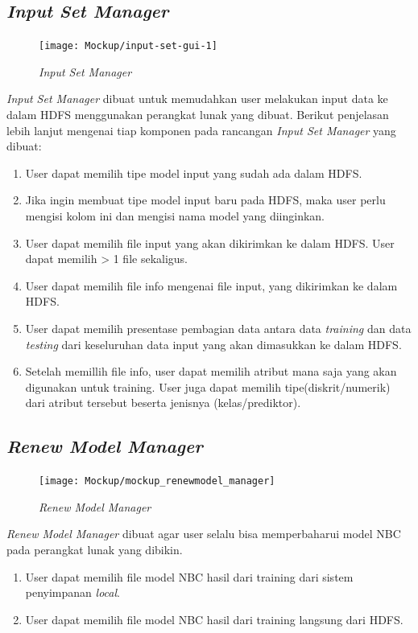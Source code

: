 \subsection{\textit{Input Set Manager}}
\label{subsec:Input Set Manager}

\begin{figure}[H]
	\centering
	\texttt{[image: Mockup/input-set-gui-1]}
	\caption[\textit{Input Set Manager}]{\textit{Input Set Manager}}
	\label{fig:Input Set Manager}
\end{figure}
\textit{Input Set Manager} dibuat untuk memudahkan user melakukan input data ke dalam HDFS menggunakan perangkat lunak yang dibuat. Berikut penjelasan lebih lanjut mengenai tiap komponen pada rancangan \textit{Input Set Manager} yang dibuat:
\begin{enumerate}
	\item User dapat memilih tipe model input yang sudah ada dalam HDFS.
	\item Jika ingin membuat tipe model input baru pada HDFS, maka user perlu mengisi kolom ini dan mengisi nama model yang diinginkan.
	\item User dapat memilih file input yang akan dikirimkan ke dalam HDFS. User dapat memilih > 1 file sekaligus.
	\item User dapat memilih file info mengenai file input, yang dikirimkan ke dalam HDFS.
	\item User dapat memilih presentase pembagian data antara data \textit{training} dan data \textit{testing} dari keseluruhan data input yang akan dimasukkan ke dalam HDFS.
	\item Setelah memillih file info, user dapat memilih atribut mana saja yang akan digunakan untuk training. User juga dapat memilih tipe(diskrit/numerik) dari atribut tersebut beserta jenisnya (kelas/prediktor).
\end{enumerate}

\subsection{\textit{Renew Model Manager}}
\label{subsec:Renew Model Manager}

\begin{figure}[H]
	\centering
	\texttt{[image: Mockup/mockup\_renewmodel\_manager]}
	\caption[\textit{Renew Model Manager}]{\textit{Renew Model Manager}}
	\label{fig:Renew Model Manager}
\end{figure}
\textit{Renew Model Manager} dibuat agar user selalu bisa memperbaharui model NBC pada perangkat lunak yang dibikin.
\begin{enumerate}
	\item User dapat memilih file model NBC hasil dari training dari sistem penyimpanan \textit{local}.
	\item User dapat memilih file model NBC hasil dari training langsung dari HDFS.
\end{enumerate}

